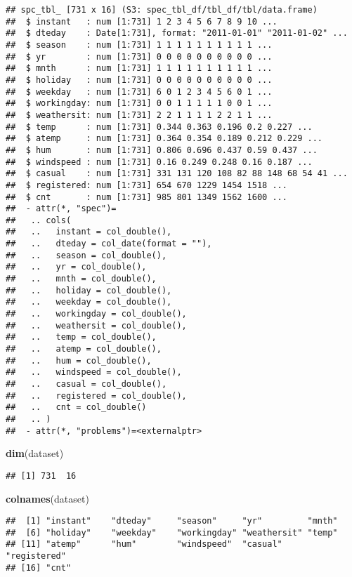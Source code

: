 \documentclass[
]{article}
\newenvironment{Shaded}{\begin{snugshade}}{\end{snugshade}}
\newcommand{\FunctionTok}[1]{\textcolor[rgb]{0.13,0.29,0.53}{\textbf{#1}}}
\newcommand{\NormalTok}[1]{#1}
\begin{document}
\begin{verbatim}
## spc_tbl_ [731 x 16] (S3: spec_tbl_df/tbl_df/tbl/data.frame)
##  $ instant   : num [1:731] 1 2 3 4 5 6 7 8 9 10 ...
##  $ dteday    : Date[1:731], format: "2011-01-01" "2011-01-02" ...
##  $ season    : num [1:731] 1 1 1 1 1 1 1 1 1 1 ...
##  $ yr        : num [1:731] 0 0 0 0 0 0 0 0 0 0 ...
##  $ mnth      : num [1:731] 1 1 1 1 1 1 1 1 1 1 ...
##  $ holiday   : num [1:731] 0 0 0 0 0 0 0 0 0 0 ...
##  $ weekday   : num [1:731] 6 0 1 2 3 4 5 6 0 1 ...
##  $ workingday: num [1:731] 0 0 1 1 1 1 1 0 0 1 ...
##  $ weathersit: num [1:731] 2 2 1 1 1 1 2 2 1 1 ...
##  $ temp      : num [1:731] 0.344 0.363 0.196 0.2 0.227 ...
##  $ atemp     : num [1:731] 0.364 0.354 0.189 0.212 0.229 ...
##  $ hum       : num [1:731] 0.806 0.696 0.437 0.59 0.437 ...
##  $ windspeed : num [1:731] 0.16 0.249 0.248 0.16 0.187 ...
##  $ casual    : num [1:731] 331 131 120 108 82 88 148 68 54 41 ...
##  $ registered: num [1:731] 654 670 1229 1454 1518 ...
##  $ cnt       : num [1:731] 985 801 1349 1562 1600 ...
##  - attr(*, "spec")=
##   .. cols(
##   ..   instant = col_double(),
##   ..   dteday = col_date(format = ""),
##   ..   season = col_double(),
##   ..   yr = col_double(),
##   ..   mnth = col_double(),
##   ..   holiday = col_double(),
##   ..   weekday = col_double(),
##   ..   workingday = col_double(),
##   ..   weathersit = col_double(),
##   ..   temp = col_double(),
##   ..   atemp = col_double(),
##   ..   hum = col_double(),
##   ..   windspeed = col_double(),
##   ..   casual = col_double(),
##   ..   registered = col_double(),
##   ..   cnt = col_double()
##   .. )
##  - attr(*, "problems")=<externalptr>
\end{verbatim}

\begin{Shaded}
\begin{Highlighting}[]
\FunctionTok{dim}\NormalTok{(dataset)}
\end{Highlighting}
\end{Shaded}

\begin{verbatim}
## [1] 731  16
\end{verbatim}

\begin{Shaded}
\begin{Highlighting}[]
\FunctionTok{colnames}\NormalTok{(dataset)}
\end{Highlighting}
\end{Shaded}

\begin{verbatim}
##  [1] "instant"    "dteday"     "season"     "yr"         "mnth"      
##  [6] "holiday"    "weekday"    "workingday" "weathersit" "temp"      
## [11] "atemp"      "hum"        "windspeed"  "casual"     "registered"
## [16] "cnt"
\end{verbatim}
\end{document}
